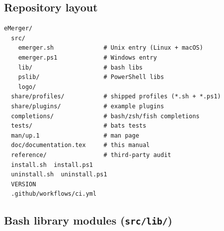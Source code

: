 \documentclass[11pt,a4paper]{article}
\begin{document}
\subsection{Repository layout}

\begin{lstlisting}[basicstyle=\ttfamily\footnotesize]
eMerger/
  src/
    emerger.sh              # Unix entry (Linux + macOS)
    emerger.ps1             # Windows entry
    lib/                    # bash libs
    pslib/                  # PowerShell libs
    logo/
  share/profiles/           # shipped profiles (*.sh + *.ps1)
  share/plugins/            # example plugins
  completions/              # bash/zsh/fish completions
  tests/                    # bats tests
  man/up.1                  # man page
  doc/documentation.tex     # this manual
  reference/                # third-party audit
  install.sh  install.ps1
  uninstall.sh  uninstall.ps1
  VERSION
  .github/workflows/ci.yml
\end{lstlisting}

\subsection{Bash library modules (\texttt{src/lib/})}
\end{document}
